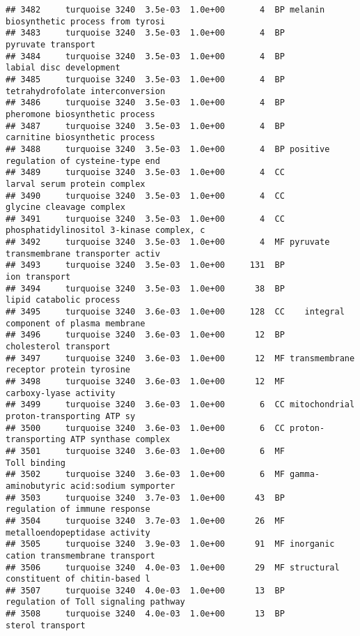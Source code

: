 \documentclass[]{article}
\begin{document}
\begin{verbatim}
## 3482     turquoise 3240  3.5e-03  1.0e+00       4  BP melanin biosynthetic process from tyrosi
## 3483     turquoise 3240  3.5e-03  1.0e+00       4  BP                       pyruvate transport
## 3484     turquoise 3240  3.5e-03  1.0e+00       4  BP                  labial disc development
## 3485     turquoise 3240  3.5e-03  1.0e+00       4  BP         tetrahydrofolate interconversion
## 3486     turquoise 3240  3.5e-03  1.0e+00       4  BP           pheromone biosynthetic process
## 3487     turquoise 3240  3.5e-03  1.0e+00       4  BP           carnitine biosynthetic process
## 3488     turquoise 3240  3.5e-03  1.0e+00       4  BP positive regulation of cysteine-type end
## 3489     turquoise 3240  3.5e-03  1.0e+00       4  CC             larval serum protein complex
## 3490     turquoise 3240  3.5e-03  1.0e+00       4  CC                 glycine cleavage complex
## 3491     turquoise 3240  3.5e-03  1.0e+00       4  CC phosphatidylinositol 3-kinase complex, c
## 3492     turquoise 3240  3.5e-03  1.0e+00       4  MF pyruvate transmembrane transporter activ
## 3493     turquoise 3240  3.5e-03  1.0e+00     131  BP                            ion transport
## 3494     turquoise 3240  3.5e-03  1.0e+00      38  BP                  lipid catabolic process
## 3495     turquoise 3240  3.6e-03  1.0e+00     128  CC    integral component of plasma membrane
## 3496     turquoise 3240  3.6e-03  1.0e+00      12  BP                    cholesterol transport
## 3497     turquoise 3240  3.6e-03  1.0e+00      12  MF transmembrane receptor protein tyrosine 
## 3498     turquoise 3240  3.6e-03  1.0e+00      12  MF                   carboxy-lyase activity
## 3499     turquoise 3240  3.6e-03  1.0e+00       6  CC mitochondrial proton-transporting ATP sy
## 3500     turquoise 3240  3.6e-03  1.0e+00       6  CC proton-transporting ATP synthase complex
## 3501     turquoise 3240  3.6e-03  1.0e+00       6  MF                             Toll binding
## 3502     turquoise 3240  3.6e-03  1.0e+00       6  MF gamma-aminobutyric acid:sodium symporter
## 3503     turquoise 3240  3.7e-03  1.0e+00      43  BP            regulation of immune response
## 3504     turquoise 3240  3.7e-03  1.0e+00      26  MF            metalloendopeptidase activity
## 3505     turquoise 3240  3.9e-03  1.0e+00      91  MF inorganic cation transmembrane transport
## 3506     turquoise 3240  4.0e-03  1.0e+00      29  MF structural constituent of chitin-based l
## 3507     turquoise 3240  4.0e-03  1.0e+00      13  BP     regulation of Toll signaling pathway
## 3508     turquoise 3240  4.0e-03  1.0e+00      13  BP                         sterol transport

\end{verbatim}
\end{document}
